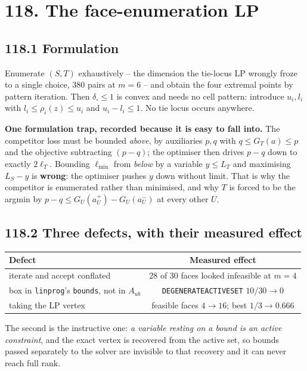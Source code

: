 \documentclass[9pt,twocolumn]{article}
\renewcommand{\_}{\CIGunderscore\allowbreak}
\begin{document}
\section*{118. The face-enumeration LP}
\subsection*{118.1 Formulation}
Enumerate $(S,T)$ exhaustively -- the dimension the tie-locus LP wrongly froze to a single choice, $380$ pairs at $m=6$ -- and obtain the four extremal points by pattern iteration. Then $\delta_{\square}\le1$ is convex and needs no cell pattern: introduce $u_i,l_i$ with $l_i\le\rho_i(z)\le u_i$ and $u_i-l_i\le1$. No tie locus occurs anywhere.

\textbf{One formulation trap, recorded because it is easy to fall into.} The competitor loss must be bounded \emph{above}, by auxiliaries $p,q$ with $q\le G_T(a)\le p$ and the objective subtracting $(p-q)$; the optimiser then drives $p-q$ down to exactly $2\ell_T$. Bounding $\ell_{\min}$ from \emph{below} by a variable $y\le L_T$ and maximising $L_S-y$ is \textbf{wrong}: the optimiser pushes $y$ down without limit. That is why the competitor is enumerated rather than minimised, and why $T$ is forced to be the argmin by $p-q\le G_U(a_U^+)-G_U(a_U^-)$ at every other $U$.

\subsection*{118.2 Three defects, with their measured effect}
\begin{center}\scriptsize
\begin{tabularx}{0.98\columnwidth}{Xc}
\toprule
Defect & Measured effect\\
\midrule
iterate and accept conflated & 28 of 30 faces looked infeasible at $m=4$\\
box in \texttt{linprog}'s \texttt{bounds}, not in $A_{ub}$ & \texttt{DEGENERATE\_ACTIVE\_SET} $10/30\to0$\\
taking the LP vertex & feasible faces $4\to16$; best $1/3\to0.666$\\
\bottomrule
\end{tabularx}
\end{center}
The second is the instructive one: \emph{a variable resting on a bound is an active constraint}, and the exact vertex is recovered from the active set, so bounds passed separately to the solver are invisible to that recovery and it can never reach full rank.
\end{document}
